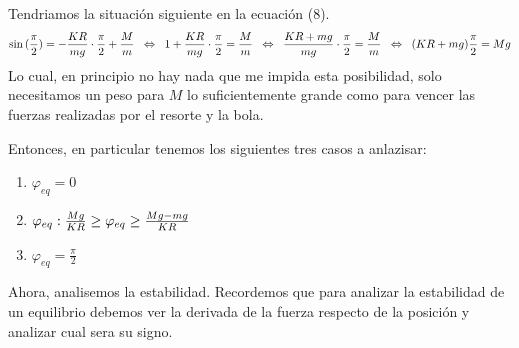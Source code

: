\documentclass[10pt]{article}
\begin{document}
  Tendriamos la situación siguiente en la ecuación (8).
  \[\sin{(\frac{\pi}{2})} = -\frac{K R}{m g} \cdot \frac{\pi}{2} + \frac{M}{m} \hspace{0.2cm} \Leftrightarrow \hspace{0.2cm}
  	1 + \frac{K R}{m g} \cdot \frac{\pi}{2} = \frac{M}{m} \hspace{0.2cm} \Leftrightarrow \hspace{0.2cm}
    \frac{K R + mg}{m g} \cdot \frac{\pi}{2} = \frac{M}{m} \hspace{0.2cm} \Leftrightarrow \hspace{0.2cm}
     	(K R + mg) \frac{\pi}{2} = M g 
   \]
   Lo cual, en principio no hay nada que me impida esta posibilidad, solo necesitamos un peso para $M$ lo suficientemente grande como para vencer las fuerzas realizadas por el resorte y la bola.
   
   Entonces, en particular tenemos los siguientes tres casos a anlazisar:
\begin{enumerate}
	\item $\varphi_{eq} = 0$
	\item $\varphi_{eq} : \frac{Mg}{K R} \geq  \varphi_{eq} \geq   \frac{Mg - m g}{K R}$
	\item $\varphi_{eq} = \frac{\pi}{2}$
\end{enumerate}     
  
  Ahora, analisemos la estabilidad. Recordemos que para analizar la estabilidad de un equilibrio debemos ver la derivada de la fuerza respecto de la posición y analizar cual sera su signo.
  
\end{document}
